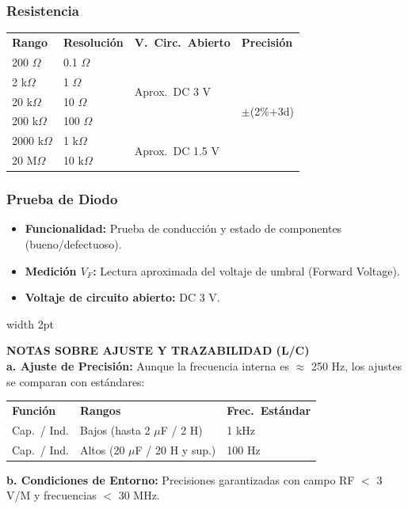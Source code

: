 \documentclass[11pt]{article}
\newcommand{\notastecnicas}[2]{%
    \vspace{6pt}
    \noindent
    \begingroup
    \color{DarkGray}
    \hspace{0.5cm}\vrule width 2pt\hspace{12pt}%
    \begin{minipage}{\dimexpr\textwidth-25pt-0.5cm\relax}
        \vspace{4pt}
        {\small\textbf{#1}}\\[0.15cm]
        \footnotesize #2
        \vspace{4pt}
    \end{minipage}
    \endgroup
    \vspace{6pt}
}
\begin{document}
\subsubsection{Resistencia}
\begin{center}
{\renewcommand{\arraystretch}{1.6}\small
\begin{tabular}{llll}
    \rowcolor{LightGray}
    \textbf{Rango} & \textbf{Resolución} & \textbf{V.\ Circ.\ Abierto} & \textbf{Precisión} \\
    200 $\Omega$   & 0.1 $\Omega$  & \multirow{4}{*}{Aprox.\ DC 3 V}   & \multirow{6}{*}{$\pm$(2\%+3d)} \\
    2 k$\Omega$    & 1 $\Omega$    & & \\
    20 k$\Omega$   & 10 $\Omega$   & & \\
    200 k$\Omega$  & 100 $\Omega$  & & \\
    2000 k$\Omega$ & 1 k$\Omega$   & \multirow{2}{*}{Aprox.\ DC 1.5 V} & \\
    20 M$\Omega$   & 10 k$\Omega$  & & \\ \hline
\end{tabular}}
\end{center}

\subsubsection{Prueba de Diodo}
\begin{itemize}[label=\small\color{IndustrialBlue}$\bullet$, leftmargin=1.2cm, itemsep=4pt]
    \item \textbf{Funcionalidad:} Prueba de conducción y estado de componentes (bueno/defectuoso).
    \item \textbf{Medición $V_F$:} Lectura aproximada del voltaje de umbral (Forward Voltage).
    \item \textbf{Voltaje de circuito abierto:} DC 3 V.
\end{itemize}

\notastecnicas{NOTAS SOBRE AJUSTE Y TRAZABILIDAD (L/C)}{%
    \textbf{a. Ajuste de Precisión:} Aunque la frecuencia interna es $\approx$ 250 Hz, los ajustes se comparan con estándares:

    \vspace{0.2cm}
    \begin{center}
    \begin{tabular}{lll}
        \rowcolor{LightGray!50}
        \textbf{Función} & \textbf{Rangos} & \textbf{Frec.\ Estándar} \\
        Cap.\ / Ind. & Bajos (hasta 2 $\mu$F / 2 H)    & 1 kHz  \\
        Cap.\ / Ind. & Altos (20 $\mu$F / 20 H y sup.) & 100 Hz \\
    \end{tabular}
    \end{center}

    \vspace{0.2cm}
    \textbf{b. Condiciones de Entorno:} Precisiones garantizadas con campo RF $<$ 3 V/M y frecuencias $<$ 30 MHz.
}
\end{document}
